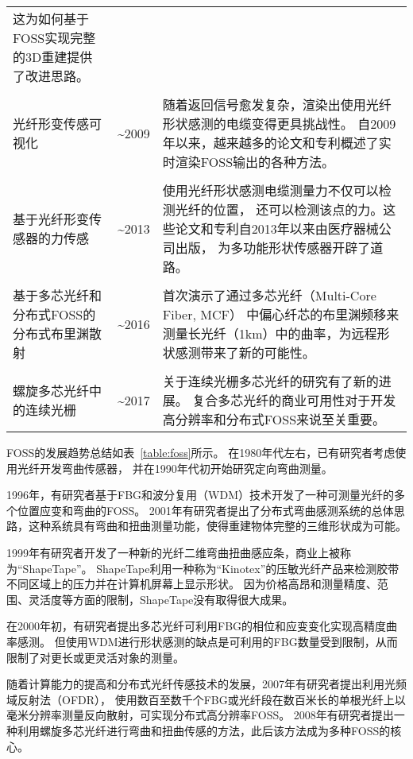 \begin{table}
\begin{center}
\begin{tabular}{p{}cp{}}
这为如何基于FOSS实现完整的3D重建提供了改进思路。
\\
\\
光纤形变传感可视化 & \textasciitilde 2009 & 随着返回信号愈发复杂，渲染出使用光纤形状感测的电缆变得更具挑战性。
自2009年以来，越来越多的论文和专利概述了实时渲染FOSS输出的各种方法。
\\
\\
基于光纤形变传感器的力传感 & \textasciitilde 2013 & 使用光纤形状感测电缆测量力不仅可以检测光纤的位置，
还可以检测该点的力。这些论文和专利自2013年以来由医疗器械公司出版，
为多功能形状传感器开辟了道路。
\\
\\
基于多芯光纤和分布式FOSS的分布式布里渊散射 & \textasciitilde 2016 & 首次演示了通过多芯光纤（Multi-Core Fiber, MCF）
中偏心纤芯的布里渊频移来测量长光纤（1km）中的曲率，为远程形状感测带来了新的可能性。
\\
\\
螺旋多芯光纤中的连续光栅 & \textasciitilde 2017 & 关于连续光栅多芯光纤的研究有了新的进展。
复合多芯光纤的商业可用性对于开发高分辨率和分布式FOSS来说至关重要。
\\
\bottomrule
\end{tabular}
\end{center}
\end{table}

FOSS的发展趋势总结如表~\ref{table:foss}所示。
在1980年代左右，已有研究者考虑使用光纤开发弯曲传感器，
并在1990年代初开始研究定向弯曲测量。

1996年，有研究者基于FBG和波分复用（WDM）技术开发了一种可测量光纤的多个位置应变和弯曲的FOSS。 
2001年有研究者提出了分布式弯曲感测系统的总体思路，这种系统具有弯曲和扭曲测量功能，使得重建物体完整的三维形状成为可能。

1999年有研究者开发了一种新的光纤二维弯曲扭曲感应条，商业上被称为“ShapeTape”\cite{ShapeTape}。
ShapeTape利用一种称为“Kinotex”的压敏光纤产品来检测胶带不同区域上的压力并在计算机屏幕上显示形状。
因为价格高昂和测量精度、范围、灵活度等方面的限制，ShapeTape没有取得很大成果。

在2000年初，有研究者提出多芯光纤可利用FBG的相位和应变变化实现高精度曲率感测。
但使用WDM进行形状感测的缺点是可利用的FBG数量受到限制，从而限制了对更长或更灵活对象的测量。

随着计算能力的提高和分布式光纤传感技术的发展，2007年有研究者提出利用光频域反射法（OFDR），
使用数百至数千个FBG或光纤段在数百米长的单根光纤上以毫米分辨率测量反向散射，可实现分布式高分辨率FOSS。
2008年有研究者提出一种利用螺旋多芯光纤进行弯曲和扭曲传感的方法，此后该方法成为多种FOSS的核心。

